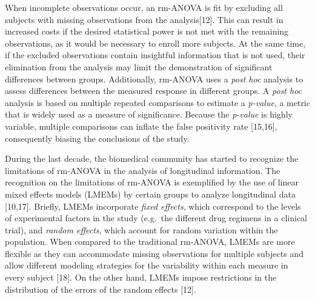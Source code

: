 \documentclass[
]{article}
\begin{document}
When incomplete observations occur, an rm-ANOVA is fit by excluding all subjects with missing observations from the analysis{[}12{]}. This can result in increased costs if the desired statistical power is not met with the remaining observations, as it would be necessary to enroll more subjects. At the same time, if the excluded observations contain insightful information that is not used, their elimination from the analysis may limit the demonstration of significant differences between groups. Additionally, rm-ANOVA uses a \emph{post hoc} analysis to assess differences between the measured response in different groups. A \emph{post hoc} analysis is based on multiple repeated comparisons to estimate a \emph{p-value}, a metric that is widely used as a measure of significance. Because the \emph{p-value} is highly variable, multiple comparisons can inflate the false positivity rate {[}15,16{]}, consequently biasing the conclusions of the study.

During the last decade, the biomedical community has started to recognize the limitations of rm-ANOVA in the analysis of longitudinal information. The recognition on the limitations of rm-ANOVA is exemplified by the use of linear mixed effects models (LMEMs) by certain groups to analyze longitudinal data {[}10,17{]}. Briefly, LMEMs incorporate \emph{fixed effects}, which correspond to the levels of experimental factors in the study (e.g.~the different drug regimens in a clinical trial), and \emph{random effects}, which account for random variation within the population. When compared to the traditional rm-ANOVA, LMEMs are more flexible as they can accommodate missing observations for multiple subjects and allow different modeling strategies for the variability within each measure in every subject {[}18{]}. On the other hand, LMEMs impose restrictions in the distribution of the errors of the random effects {[}12{]}.
\end{document}
